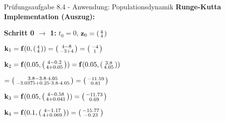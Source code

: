 \begin{example2}{Prüfungsaufgabe 8.4 - Anwendung: Populationsdynamik}
\textbf{Runge-Kutta Implementation (Auszug):}

\textbf{Schritt 0 $\rightarrow$ 1:} $t_0 = 0$, $\mathbf{z}_0 = \begin{psmallmatrix} 4 \\ 4 \end{psmallmatrix}$

$\mathbf{k}_1 = \mathbf{f}(0, \begin{psmallmatrix} 4 \\ 4 \end{psmallmatrix}) = \begin{psmallmatrix} 4 - 8 \\ -3 + 4 \end{psmallmatrix} = \begin{psmallmatrix} -4 \\ 1 \end{psmallmatrix}$

$\mathbf{k}_2 = \mathbf{f}(0.05, \begin{psmallmatrix} 4 - 0.2 \\ 4 + 0.05 \end{psmallmatrix}) = \mathbf{f}(0.05, \begin{psmallmatrix} 3.8 \\ 4.05 \end{psmallmatrix})$


$= \begin{psmallmatrix} 3.8 - 3.8 \cdot 4.05 \\ -3.0375 + 0.25 \cdot 3.8 \cdot 4.05 \end{psmallmatrix} = \begin{psmallmatrix} -11.59 \\ 0.81 \end{psmallmatrix}$

$\mathbf{k}_3 = \mathbf{f}(0.05, \begin{psmallmatrix} 4 - 0.58 \\ 4 + 0.041 \end{psmallmatrix}) = \begin{psmallmatrix} -11.73 \\ 0.69 \end{psmallmatrix}$

$\mathbf{k}_4 = \mathbf{f}(0.1, \begin{psmallmatrix} 4 - 1.17 \\ 4 + 0.069 \end{psmallmatrix}) = \begin{psmallmatrix} -15.77 \\ -0.23 \end{psmallmatrix}$


\end{example2}
